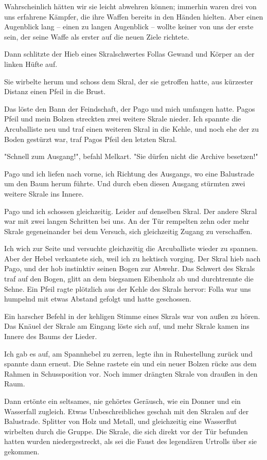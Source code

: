 \documentclass[10pt, a4paper, oneside]{book}
\begin{document}
\begin{multicols}{2}
Wahrscheinlich hätten wir sie leicht abwehren können; immerhin waren drei von uns erfahrene Kämpfer, die ihre Waffen bereits in den Händen hielten. Aber einen Augenblick lang – einen zu langen Augenblick – wollte keiner von uns der erste sein, der seine Waffe als erster auf die neuen Ziele richtete.

Dann schlitzte der Hieb eines Skralschwertes Follas Gewand und Körper an der linken Hüfte auf.

Sie wirbelte herum und schoss dem Skral, der sie getroffen hatte, aus kürzester Distanz einen Pfeil in die Brust.

Das löste den Bann der Feindschaft, der Pago und mich umfangen hatte. Pagos Pfeil und mein Bolzen streckten zwei weitere Skrale nieder. Ich spannte die Arcuballiste neu und traf einen weiteren Skral in die Kehle, und noch ehe der zu Boden gestürzt war, traf Pagos Pfeil den letzten Skral.

"Schnell zum Ausgang!", befahl Melkart. "Sie dürfen nicht die Archive
besetzen!"

Pago und ich liefen nach vorne, ich Richtung des Ausgangs, wo eine
Balustrade um den Baum herum führte.
Und durch eben diesen Ausgang stürmten zwei weitere Skrale ins Innere.

Pago und ich schossen gleichzeitig. Leider auf denselben Skral. Der andere Skral war mit zwei langen Schritten bei uns. An der Tür rempelten zehn oder mehr Skrale gegeneinander bei dem Versuch, sich gleichzeitig Zugang zu verschaffen.

Ich wich zur Seite und versuchte gleichzeitig die Arcuballiste wieder zu spannen. Aber der Hebel verkantete sich, weil ich zu hektisch vorging. Der Skral hieb nach Pago, und der hob instinktiv seinen Bogen zur Abwehr. Das Schwert des Skrals traf auf den Bogen, glitt an dem biegsamen Eibenholz ab und durchtrennte die Sehne. Ein Pfeil ragte plötzlich aus der Kehle des Skrals hervor: Folla war uns humpelnd mit etwas Abstand gefolgt und hatte geschossen.

Ein harscher Befehl in der kehligen Stimme eines Skrals war von außen zu hören. Das Knäuel der Skrale am Eingang löste sich auf, und mehr Skrale kamen ins Innere des Baums der Lieder.

Ich gab es auf, am Spannhebel zu zerren, legte ihn in Ruhestellung zurück und spannte dann erneut. Die Sehne rastete ein und ein neuer Bolzen rücke aus dem Rahmen in Schussposition vor. Noch immer drängten Skrale von draußen in den Raum.

Dann ertönte ein seltsames, nie gehörtes Geräusch, wie ein Donner und ein Wasserfall zugleich. Etwas Unbeschreibliches geschah mit den Skralen auf der Balustrade. Splitter von Holz und Metall, und gleichzeitig eine Wasserflut wirbelten durch die Gruppe. Die Skrale, die sich direkt vor der Tür befunden hatten wurden niedergestreckt, als sei die Faust des legendären Urtrolls über sie gekommen.


\end{multicols}
\end{document}
